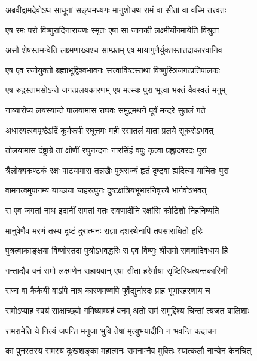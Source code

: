 \twolineshloka
{अब्रवीद्वामदेवोऽथ साधूनां सङ्घमध्यगः}
{मानुशोचथ रामं वा सीतां वा वच्मि तत्त्वतः} %

\twolineshloka
{एष रमः परो विष्णुरादिनारायणः स्मृतः}
{एषा सा जानकी लक्ष्मीर्योगमायेति विश्रुता} %

\twolineshloka
{असौ शेषस्तमन्वेति लक्ष्मणाख्यश्च साम्प्रतम्}
{एष मायागुणैर्युक्तस्तत्तदाकारवानिव} %

\twolineshloka
{एष एव रजोयुक्तो ब्रह्माभूद्विश्वभावनः}
{सत्त्वाविष्टस्तथा विष्णुस्त्रिजगत्प्रतिपालकः} %

\twolineshloka
{एष रुद्रस्तामसोऽन्ते जगत्प्रलयकारणम्}
{एष मत्स्यः पुरा भूत्वा भक्तं वैवस्वतं मनुम्} %

\twolineshloka
{नाव्यारोप्य लयस्यान्ते पालयामास राघवः}
{समुद्रमथने पूर्वं मन्दरे सुतलं गते} %

\twolineshloka
{अधारयत्स्वपृष्ठेऽद्रिं कूर्मरूपी रघूत्तमः}
{मही रसातलं याता प्रलये सूकरोऽभवत्} %

\twolineshloka
{तोलयामास दंष्ट्राग्रे तां क्षोणीं रघुनन्दनः}
{नारसिंहं वपुः कृत्वा प्रह्लादवरदः पुरा} %

\twolineshloka
{त्रैलोक्यकण्टकं रक्षः पाटयामास तन्नखैः}
{पुत्रराज्यं हृतं दृष्ट्वा ह्यदित्या याचितः पुरा} %

\twolineshloka
{वामनत्वमुपागम्य याच्ञया चाहरत्पुनः}
{दुष्टक्षत्रियभूभारनिवृत्त्यै भार्गवोऽभवत्} %

\twolineshloka
{स एव जगतां नाथ इदानीं रामतां गतः}
{रावणादीनि रक्षांसि कोटिशो निहनिष्यति} %

\twolineshloka
{मानुषेणैव मरणं तस्य दृष्टं दुरात्मनः}
{राज्ञा दशरथेनापि तपसाराधितो हरिः} %

\twolineshloka
{पुत्रत्वाकाङ्क्षया विष्णोस्तदा पुत्रोऽभवद्धरिः}
{स एव विष्णुः श्रीरामो रावणादिवधाय हि} %

\twolineshloka
{गन्ताद्यैव वनं रामो लक्ष्मणेन सहायवान्}
{एषा सीता हरेर्माया सृष्टिस्थित्यन्तकारिणी} %

\twolineshloka
{राजा वा कैकेयी वाऽपि नात्र कारणमण्वपि}
{पूर्वेद्युर्नारदः प्राह भूभारहरणाय च} %

\twolineshloka
{रामोऽप्याह स्वयं साक्षाच्छ्वो गमिष्याम्यहं वनम्}
{अतो रामं समुद्दिश्य चिन्तां त्यजत बालिशाः} %

\twolineshloka
{रामरामेति ये नित्यं जपन्ति मनुजा भुवि}
{तेषां मृत्युभयादीनि न भवन्ति कदाचन} %

\twolineshloka
{का पुनस्तस्य रामस्य दुःखशङ्का महात्मनः}
{रामनाम्नैव मुक्तिः स्यात्कलौ नान्येन केनचित्} %


